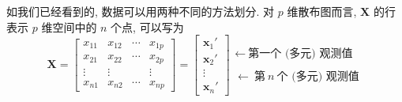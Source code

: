 如我们已经看到的, 数据可以用两种不同的方法划分. 对 $p$ 维散布图而言, $\mathbf{X}$ 的行表示 $p$ 维空间中的 $n$ 个点, 可以写为
\label{eq:3-1}
\begin{equation}
\mathbf{X}=\begin{bmatrix}
x_{11}&x_{12}&\cdots&x_{1p}\\
x_{21}&x_{22}&\cdots&x_{2p}\\
\vdots&\vdots&&\vdots\\
x_{n1}&x_{n2}&\cdots&x_{np}
\end{bmatrix}
=\begin{bmatrix}
\mathbf{x}_{1}'\\[2pt]
\mathbf{x}_{2}'\\[2pt]
\vdots\\[2pt]
\mathbf{x}_{n}'
\end{bmatrix}
\begin{array}{l}
\leftarrow\ \text{第一个 (多元) 观测值}\\\\
\leftarrow\ \text{第}\ n\ \text{个 (多元) 观测值}
\end{array}
\tag{3-1}
\end{equation}
